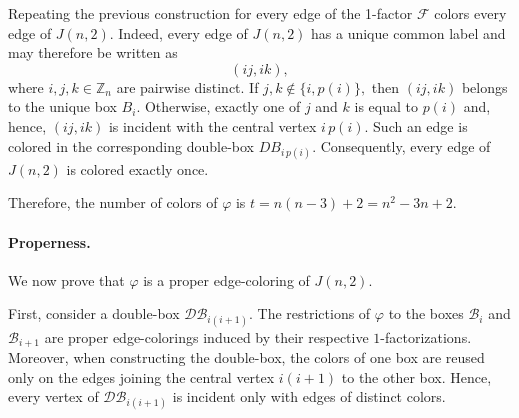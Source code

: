 \documentclass{article}
\newcommand{\Z}{\mathbb{Z}}
\newcommand{\blue}[1]{\textcolor{blue}{#1}}
\def\greeen{\textcolor[RGB]{47, 141, 26 }}
\begin{document}
Repeating the previous construction for every edge of the
1-factor $\mathcal F$ colors every edge of $J(n,2)$.
Indeed, every edge of $J(n,2)$ has a unique common label and may
therefore be written as
$$
(ij,ik),
$$
where $i,j,k\in\mathbb{Z}_n$ are pairwise distinct. If
$j,k\notin\{i,p(i)\},$
then $(ij,ik)$ belongs to the unique box $B_i$. Otherwise, exactly one
of $j$ and $k$ is equal to $p(i)$ and, hence, $(ij,ik)$ is incident
with the central vertex $i\,p(i)$. Such an edge is colored in the
corresponding double-box $DB_{i\,p(i)}$. Consequently, every edge of
$J(n,2)$ is colored exactly once.


Therefore, the number of colors of $\varphi$ is $t=n(n-3)+2=n^2-3n+2$. %


\paragraph{Properness.}
We now prove that $\varphi$ is a proper edge-coloring of $J(n,2)$.

First, consider a double-box $\mathcal{DB}_{i(i+1)}$. The restrictions of
$\varphi$ to the boxes $\mathcal{B}_i$ and $\mathcal{B}_{i+1}$ are proper
edge-colorings induced by their respective $1$-factorizations. Moreover,
when constructing the double-box, the colors of one box are reused only on
the edges joining the central vertex $i(i+1)$ to the other box. Hence,
every vertex of $\mathcal{DB}_{i(i+1)}$ is incident only with edges of
distinct colors.
\end{document}
